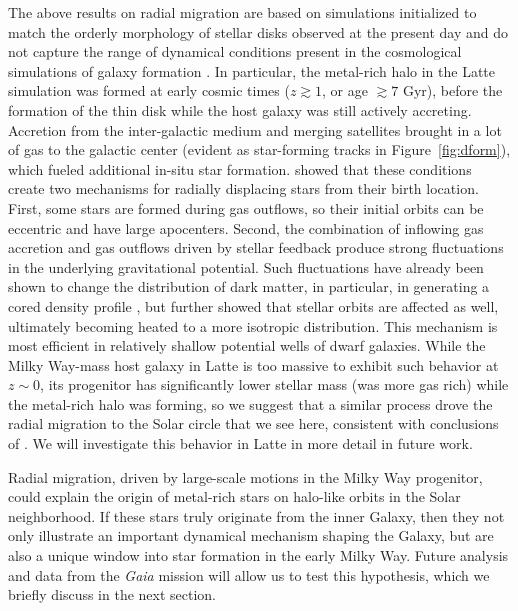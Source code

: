 \documentclass[apj, twocolappendix, numberedappendix, appendixfloats]{emulateapj}
\begin{document}
The above results on radial migration are based on simulations initialized to match the orderly morphology of stellar disks observed at the present day and do not capture the range of dynamical conditions present in the cosmological simulations of galaxy formation \citep[e.g.,][]{agertz2009}.
In particular, the metal-rich halo in the Latte simulation was formed at early cosmic times ($z \gtrsim 1$, or age $\gtrsim 7$ Gyr), before the formation of the thin disk \citep{ma2016} while the host galaxy was still actively accreting.
Accretion from the inter-galactic medium and merging satellites brought in a lot of gas to the galactic center (evident as star-forming tracks in Figure~\ref{fig:dform}), which fueled additional in-situ star formation.
\citet{elbadry2016} showed that these conditions create two mechanisms for radially displacing stars from their birth location.
First, some stars are formed during gas outflows, so their initial orbits can be eccentric and have large apocenters.
Second, the combination of inflowing gas accretion and gas outflows driven by stellar feedback produce strong fluctuations in the underlying gravitational potential.
Such fluctuations have already been shown to change the distribution of dark matter, in particular, in generating a cored density profile \citep[e.g.,][]{pontzen2012, brooks2014, dicintio2014, chan:fire.dwarf.cusps}, but \citet{elbadry2016} further showed that stellar orbits are affected as well, ultimately becoming heated to a more isotropic distribution.
This mechanism is most efficient in relatively shallow potential wells of dwarf galaxies.
While the Milky Way-mass host galaxy in Latte is too massive to exhibit such behavior at $z \sim 0$, its progenitor has significantly lower stellar mass (was more gas rich) while the metal-rich halo was forming, so we suggest that a similar process drove the radial migration to the Solar circle that we see here, consistent with conclusions of \citet{ma2017}.
We will investigate this behavior in Latte in more detail in future work.

Radial migration, driven by large-scale motions in the Milky Way progenitor, could explain the origin of metal-rich stars on halo-like orbits in the Solar neighborhood.
If these stars truly originate from the inner Galaxy, then they not only illustrate an important dynamical mechanism shaping the Galaxy, but are also a unique window into star formation in the early Milky Way.
Future analysis and data from the \emph{Gaia} mission will allow us to test this hypothesis, which we briefly discuss in the next section.
\end{document}
